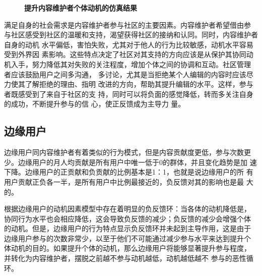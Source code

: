 \begin{figure}[!htb]
  \centering
  \caption{\small{\textbf{提升内容维护者个体动机的仿真结果}}}
  \label{fig:improve8}
\end{figure}
满足自身的社会需求是内容维护者参与社区的主要因素。内容维护者希望借由参
与社区感受到社区的温暖和支持，渴望获得社区的接纳和认同。同时，内容维护者自身的动机
水平偏低，害怕失败，尤其对于他人的行为比较敏感，动机水平容易受到外界因
素影响。这些特点决定了社区对其支持的方向应该是从保护其协同动
机入手，努力降低其对失败的关注程度，增加个体之间的协调和互动。社区管理
者应该鼓励用户之间多沟通，
多讨论，尤其是当拒绝某个人编辑的内容时应该尽力使其了解拒绝的理由、指明
改进的方向，帮助其提升编辑的水平。这样，参与者既感受到了来自于社区的支
持，同时可以将负面的感觉降低，转而多关注自身的成功，不断提升参与的信
心，使正反馈成为主导力
量。

\subsection{边缘用户}
边缘用户同内容维护者有着类似的行为模式，但是内容贡献度更低，参与次数更
少。边缘用户的月人均贡献是所有用户中唯一低于0的群体，并且变化趋势是加
速下降。边缘用户的正贡献和负贡献的比例基本是1：1，也就是说边缘用户的所
有用户贡献正负各一半，是所有用户中比例最接近的，负反馈对其的影响也是最
大的。

根据边缘用户的动机因素模型中存在着明显的负反馈环：当各体的动机降低是，
协同行为水平也会相应降低，这会导致负反馈的减少；负反馈的减少会增强个体
的动机。但是，边缘用户的行为特点显示负反馈环并未起到主导作用，这是由于
边缘用户参与的次数非常少，以至于他们不可能通过减少参与水平来达到提升个
体动机的目的。如果提升个体的动机，那么边缘用户将能够显著提升参与程度，
并转化为内容维护者，摆脱之前越不参与动机越低，动机越低越不
参与的恶性循环。

